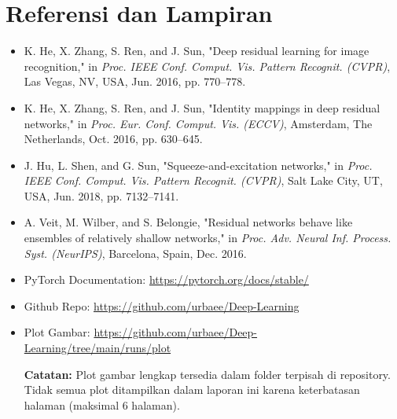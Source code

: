 \section{Referensi dan Lampiran}

\begin{itemize}
    \item K. He, X. Zhang, S. Ren, and J. Sun, "Deep residual learning for image recognition," 
        in \textit{Proc. IEEE Conf. Comput. Vis. Pattern Recognit. (CVPR)}, Las Vegas, NV, USA, Jun. 2016, pp. 770–778.
        \item K. He, X. Zhang, S. Ren, and J. Sun, "Identity mappings in deep residual networks," 
        in \textit{Proc. Eur. Conf. Comput. Vis. (ECCV)}, Amsterdam, The Netherlands, Oct. 2016, pp. 630–645.
        \item J. Hu, L. Shen, and G. Sun, "Squeeze-and-excitation networks," 
        in \textit{Proc. IEEE Conf. Comput. Vis. Pattern Recognit. (CVPR)}, Salt Lake City, UT, USA, Jun. 2018, pp. 7132–7141.
        \item A. Veit, M. Wilber, and S. Belongie, "Residual networks behave like ensembles of relatively shallow networks," 
        in \textit{Proc. Adv. Neural Inf. Process. Syst. (NeurIPS)}, Barcelona, Spain, Dec. 2016.
        \item PyTorch Documentation: \url{https://pytorch.org/docs/stable/}
        \item Github Repo: \url{https://github.com/urbaee/Deep-Learning}
        \item Plot Gambar: \url{https://github.com/urbaee/Deep-Learning/tree/main/runs/plot}
        
        \textbf{Catatan:} Plot gambar lengkap tersedia dalam folder terpisah di repository. 
        Tidak semua plot ditampilkan dalam laporan ini karena keterbatasan halaman (maksimal 6 halaman).
\end{itemize}
